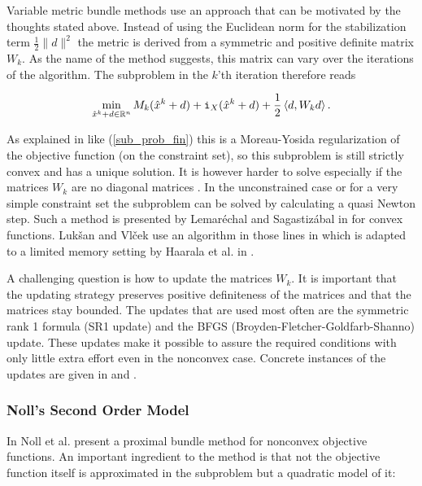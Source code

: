 Variable metric bundle methods use an approach that can be motivated by the thoughts stated above.
Instead of using the Euclidean norm for the stabilization term \(\frac{1}{2}\|d\|^2 \) the metric is derived from a symmetric and positive definite matrix \(W_k\). As the name of the method suggests, this matrix can vary over the iterations of the algorithm. The subproblem in the \(k\)'th iteration therefore reads 

\begin{equation*}
	\min_{\hat{x}^k+d \in \mathbb{R}^n} M_k(\hat{x}^k+d)+\mathtt{i}_{X}(\hat{x}^k+d)+\frac{1}{2}\left\langle d,W_kd \right\rangle.
\end{equation*}

As explained in \cite{Lemarechal1994} like (\ref{sub_prob_fin}) this is a Moreau-Yosida regularization of the objective function (on the constraint set), so this subproblem is still strictly convex and has a unique solution. It is however harder to solve especially if the matrices \(W_k\) are no diagonal matrices \cite{Luksan1999}.
In the unconstrained case or for a very simple constraint set the subproblem can be solved by calculating a quasi Newton step. Such a method is presented by Lemar\'{e}chal and Sagastiz\'{a}bal in \cite{Lemarechal1997} for convex functions. Luk\v{s}an and {Vl\v{c}ek} use an algorithm in those lines in \cite{Vlcek2001} which is adapted to a limited memory setting by Haarala et al. in \cite{Haarala2007}.

A challenging question is how to update the matrices \(W_k\). It is important that the updating strategy preserves positive definiteness of the matrices and that the matrices stay bounded. The updates that are used most often are the symmetric rank 1 formula (SR1 update) and the BFGS (Broyden-Fletcher-Goldfarb-Shanno) update. These updates make it possible to assure the required conditions with only little extra effort even in the nonconvex case. Concrete instances of the updates are given in \cite{Vlcek2001} and \cite{Lemarechal1994}.


\subsubsection{Noll's Second Order Model}

In \cite{Noll2012} Noll et al. present a proximal bundle method for nonconvex objective functions. An important ingredient to the method is that not the objective function itself is approximated in the subproblem but a quadratic model of it:


